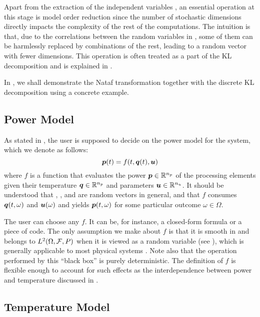 Apart from the extraction of the independent variables \vz, an essential
operation at this stage is model order reduction since the number of stochastic
dimensions directly impacts the complexity of the rest of the computations. The
intuition is that, due to the correlations between the random variables in \vu,
some of them can be harmlessly replaced by combinations of the rest, leading to
a random vector \vz with fewer dimensions. This operation is often treated as a
part of the \ac{KL} decomposition and is explained in
.

In , we shall demonstrate the Nataf transformation together
with the discrete \ac{KL} decomposition using a concrete example.

\subsection{Power Model}

As stated in , the user is supposed to decide on the power
model for the system, which we denote as follows:
\begin{equation} \elab{analog-power-model}
  \vp(t) = f(t, \vq(t), \vu)
\end{equation}
where $f$ is a function that evaluates the power $\boldsymbol{p} \in \mathbb{R}^{n_{p}}$ of the
processing elements given their temperature $\boldsymbol{q} \in \mathbb{R}^{n_{p}}$ and parameters
$\boldsymbol{u} \in \mathbb{R}^{n_{u}}$. It should be understood that \vp, \vq, and \vu are random
vectors in general, and that $f$ consumes $\boldsymbol{q}(t, \omega)$ and $\boldsymbol{u}(\omega)$ and
yields $\boldsymbol{p}(t, \omega)$ for some particular outcome $\omega \in \Omega$.

The user can choose any $f$. It can be, for instance, a closed-form formula or a
piece of code. The only assumption we make about $f$ is that it is smooth in \vz
and belongs to $\L{2}(\Omega, \mathcal{F}, \probability)$ when it is viewed as a
random variable (see ), which is generally applicable
to most physical systems \cite{xiu2010}. Note also that the operation performed
by this ``black box'' is purely deterministic. The definition of $f$ is flexible
enough to account for such effects as the interdependence between power and
temperature discussed in .

\subsection{Temperature Model}

